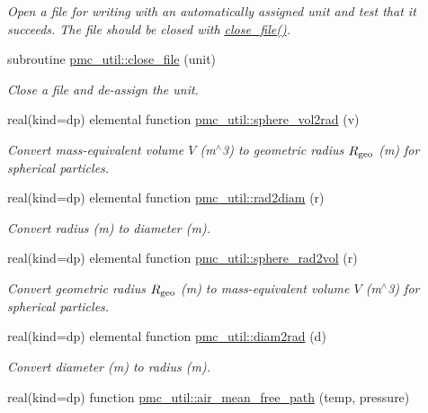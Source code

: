 \begin{DoxyCompactItemize}
\begin{DoxyCompactList}\small\item\em Open a file for writing with an automatically assigned unit and test that it succeeds. The file should be closed with \mbox{\hyperlink{namespacepmc__util_ac91736b4f44a1623208ebe7f161e84ad}{close\+\_\+file()}}. \end{DoxyCompactList}\item 
subroutine \mbox{\hyperlink{namespacepmc__util_ac91736b4f44a1623208ebe7f161e84ad}{pmc\+\_\+util\+::close\+\_\+file}} (unit)
\begin{DoxyCompactList}\small\item\em Close a file and de-\/assign the unit. \end{DoxyCompactList}\item 
real(kind=dp) elemental function \mbox{\hyperlink{namespacepmc__util_af905c1127f64dd471808b872022ed632}{pmc\+\_\+util\+::sphere\+\_\+vol2rad}} (v)
\begin{DoxyCompactList}\small\item\em Convert mass-\/equivalent volume $V$ (m$^\wedge$3) to geometric radius $R_{\rm geo}$ (m) for spherical particles. \end{DoxyCompactList}\item 
real(kind=dp) elemental function \mbox{\hyperlink{namespacepmc__util_a69ab911167fab93d371e42476e9aac73}{pmc\+\_\+util\+::rad2diam}} (r)
\begin{DoxyCompactList}\small\item\em Convert radius (m) to diameter (m). \end{DoxyCompactList}\item 
real(kind=dp) elemental function \mbox{\hyperlink{namespacepmc__util_a30ef7112d68a812b3022046e0f3a40be}{pmc\+\_\+util\+::sphere\+\_\+rad2vol}} (r)
\begin{DoxyCompactList}\small\item\em Convert geometric radius $R_{\rm geo}$ (m) to mass-\/equivalent volume $V$ (m$^\wedge$3) for spherical particles. \end{DoxyCompactList}\item 
real(kind=dp) elemental function \mbox{\hyperlink{namespacepmc__util_ab0ce0deb86bd2e48734d7e654e5c3b18}{pmc\+\_\+util\+::diam2rad}} (d)
\begin{DoxyCompactList}\small\item\em Convert diameter (m) to radius (m). \end{DoxyCompactList}\item 
real(kind=dp) function \mbox{\hyperlink{namespacepmc__util_abd28fa58b98f202bfa9e4f4bcd3a7608}{pmc\+\_\+util\+::air\+\_\+mean\+\_\+free\+\_\+path}} (temp, pressure)

\end{DoxyCompactItemize}
